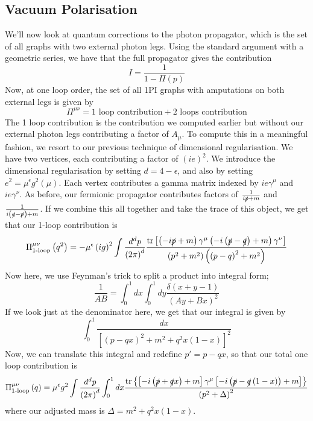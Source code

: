 \documentclass[11pt, oneside]{article}   	%
\theoremstyle{slanted}
\begin{document}
\subsection{Vacuum Polarisation}
We'll now look at quantum corrections 
to the photon propagator, which is 
the set of all graphs with 
two external photon legs. Using the standard argument 
with a geometric series, we have that 
the full propagator gives the contribution 
\[
I = \frac{1}{1 - \Pi \left( p \right) }
\] Now, at one loop order, 
the set of all 1PI graphs with amputations 
on both external legs is given by
\[
\Pi ^{ \mu \nu }  = \text{1 loop contribution} + \text{2 loops contribution}
\] The 1 loop contribution is the contribution 
we computed earlier but without our external photon legs 
contributing a factor of $ A _ \mu $. 
To compute this in a meaningful fashion, we 
resort to our previous technique of dimensional 
regularisation. 
We have two vertices, each contributing 
a factor of  $ \left( i e  \right)  ^{ 2 } $. 
We introduce the dimensional regularisation 
by setting $ d = 4-\epsilon   $, and also 
by setting $ e ^{ 2 }  = \mu ^{ \epsilon } g ^ 2 \left( \mu  \right)  $. 
Each vertex contributes a gamma matrix 
indexed by $  i e \gamma ^{ \mu } $ and $ i e \gamma ^{ \nu } $. 
As before, our fermionic propagator 
contributes factors of $ \frac{1}{i \slashed{p} + m  }$ 
and $ \frac{1 }{i \left( \slashed{q}  - \slashed{p} \right) + m }$. 
If we 
combine this all together and take the 
trace of this object, we get that 
our 1-loop contribution is 
\[
\Pi_{\text{1-loop}}^{\mu \nu } \left( q ^2 \right) 
= - \mu ^{ \epsilon } \left( i g  \right)  ^ 2 
\int \frac{d ^ d p }{ \left(  2 \pi  \right)  ^{ d } } \frac{
\tr \left[ \left( - i \slashed{p} + m   \right) \gamma ^{ \mu } \left( 
- i \left( \slashed{p} - \slashed{q} \right)  + m \right)  \gamma ^{ \nu } \right] }{
\left( p ^ 2 + m ^ 2  \right) \left( \left( p - q  \right)  ^ 2 + m ^ 2  \right)  }
\] Now here, we use Feynman's 
trick to split a product 
into integral form; 
\[
\frac{1}{AB} = \int_ 0 ^{ 1 } dx \int _ 0 ^ 1 dy \frac{\delta \left(  x + y - 1  \right)   }{
\left( A y + B x  \right)  ^ 2 }
\] If we look just at the denominator here, 
we get that our integral is given by 
\[
\int _ 0 ^ 1 \frac{dx }{ \left[  \left( p - qx  \right) ^ 2 + m ^ 2 
+ q ^2 x \left( 1 - x  \right)  \right]  ^ 2  }
\] Now, we can translate this integral and redefine 
$ p '  = p - qx $, so that our total one loop contribution 
is 
\[
\Pi_{\text{1-loop}}^{ \mu \nu } \left( q  \right)   = 
\mu ^{ \epsilon } g ^ 2 \int \frac{d ^ d p  }{ \left( 2 \pi  \right)  ^ d } 
\int_ 0 ^ 1 dx \frac{\tr \left\{  
\left[  - i \left( \slashed{p} + \slashed{q}x   \right) + m   \right] \gamma ^ \mu 
\left[  - i \left( \slashed{p} - \slashed{q}\left( 1 - x  \right)   \right) + m  \right]
\right\} }{\left( p ^ 2 + \Delta    \right) ^{ 2 } }
\]  where our adjusted mass is 
$ \Delta  = m ^ 2 + q ^ 2 x \left( 1 - x  \right)  $. 
\end{document}
